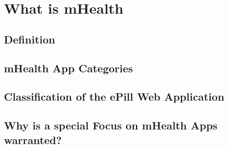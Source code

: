 \section{What is mHealth}

\subsection{Definition}

\subsection{mHealth App Categories}

\subsection{Classification of the ePill Web Application}

\subsection{Why is a special Focus on mHealth Apps warranted?}